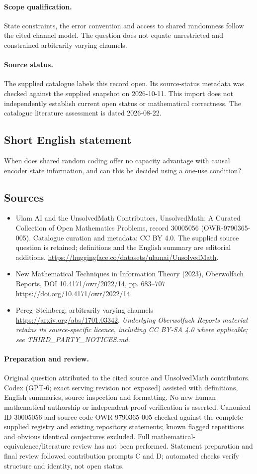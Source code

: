 \documentclass[11pt]{article}
\begin{document}
\paragraph{Scope qualification.}
State constraints, the error convention and access to shared randomness follow the cited channel model. The question does not equate unrestricted and constrained arbitrarily varying channels.
\paragraph{Source status.}
The supplied catalogue labels this record open. Its source-status metadata was checked against the supplied snapshot on 2026-10-11. This import does not independently establish current open status or mathematical correctness. The catalogue literature assessment is dated 2026-08-22.
\subsection{Short English statement}
When does shared random coding offer no capacity advantage with causal encoder state information, and can this be decided using a one-use condition?
\subsection{Sources}
\begin{itemize}
\item[S1] Ulam AI and the UnsolvedMath Contributors, UnsolvedMath: A Curated Collection of Open Mathematics Problems, record 30005056 (OWR-9790365-005). Catalogue curation and metadata: CC BY 4.0. The supplied source question is retained; definitions and the English summary are editorial additions.
\url{https://huggingface.co/datasets/ulamai/UnsolvedMath}.
\item[S2] New Mathematical Techniques in Information Theory (2023), Oberwolfach Reports, DOI 10.4171/owr/2022/14, pp. 683--707
\url{https://doi.org/10.4171/owr/2022/14}.
\item[S3] Pereg--Steinberg, arbitrarily varying channels
\url{https://arxiv.org/abs/1701.03342}.
\textit{Underlying Oberwolfach Reports material retains its source-specific licence, including CC BY-SA 4.0 where applicable; see THIRD\_PARTY\_NOTICES.md.}
\end{itemize}
\paragraph{Preparation and review.}
Original question attributed to the cited source and UnsolvedMath contributors. Codex (GPT-6; exact serving revision not exposed) assisted with definitions, English summaries, source inspection and formatting. No new human mathematical authorship or independent proof verification is asserted. Canonical ID 30005056 and source code OWR-9790365-005 checked against the complete supplied registry and existing repository statements; known flagged repetitions and obvious identical conjectures excluded. Full mathematical-equivalence/literature review has not been performed. Statement preparation and final review followed contribution prompts C and D; automated checks verify structure and identity, not open status.
\label{end:30005056}
\end{document}
